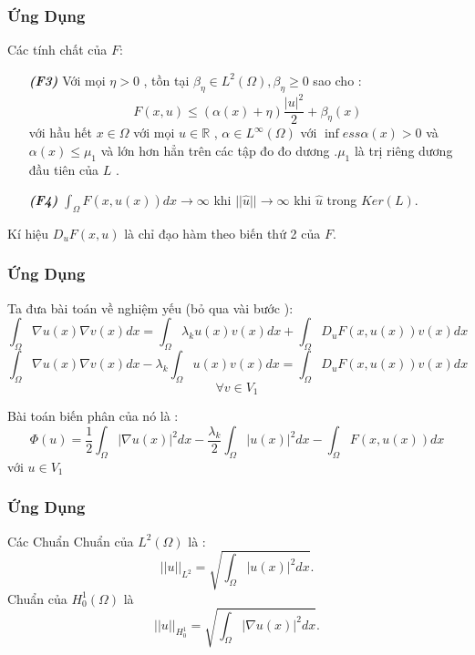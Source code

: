 \documentclass{beamer}
\begin{document}

\begin{frame}
\frametitle{Ứng Dụng}
\begin{block}{Các tính chất của $F$:}
\begin{itemize}
\item[\textbf{\textit{(F3)}}]  Với mọi $\eta  >0$ , tồn tại $\beta_{\eta}\in L^2(\Omega),\beta_{\eta}\geq 0$ sao cho : $$F(x,u)\leq (\alpha(x)+\eta)\frac{|u|^2}{2}+\beta_{\eta}(x)$$
với hầu hết $x\in \Omega$ với mọi $u\in \mathbb{R}$ , $\alpha \in L^{\infty}(\Omega)$ với $\inf ess \alpha(x)>0$ và $\alpha(x)\leq \mu_1$ và lớn hơn hẳn trên các tập đo đo dương .$\mu_1$ là trị riêng dương đầu tiên của $L$ .
\item[\textbf{\textit{(F4)}}] $\int_{\Omega}F(x,\widehat{u}(x))dx \rightarrow \infty$ khi $||\widehat{u}||\rightarrow \infty$ khi $\widehat{u}$ trong $Ker(L)$.
\end{itemize}
\end{block}
Kí hiệu $D_uF(x,u)$ là chỉ đạo hàm theo biến thứ 2 của $F$.\\
\end{frame}

\begin{frame}
\frametitle{Ứng Dụng}
\begin{block}{Ta đưa bài toán về nghiệm yếu (bỏ qua vài bước ):}
$$\int _{\Omega}\nabla u(x)\nabla v(x)dx=\int _{\Omega}\lambda_k u(x)v(x)dx+\int _{\Omega}D_uF(x,u(x))v(x)dx$$
$$\int _{\Omega}\nabla u(x)\nabla v(x)dx-\lambda_k\int _{\Omega} u(x)v(x)dx=\int _{\Omega}D_uF(x,u(x))v(x)dx$$
$$\forall v\in V_1$$
\end{block}
\begin{block}{Bài toán biến phân của nó là : }
$$\Phi(u)=\frac{1}{2}\int_{\Omega}|\nabla u(x)|^2dx-\frac{\lambda_k}{2}\int _{\Omega} |u(x)|^2dx-\int_{\Omega}F(x,u(x))dx$$
với $u\in V_1$\\
\end{block}
\end{frame}

\begin{frame}
\frametitle{Ứng Dụng}
\begin{block}{Các Chuẩn}
Chuẩn của $L^2(\Omega)$ là : $$||u||_{L^2}=\sqrt{\int_{\Omega}| u(x)|^2dx}.$$
Chuẩn của $H^1_0(\Omega)$ là $$||u||_{H^1_0}=\sqrt{\int_{\Omega}|\nabla u(x)|^2dx}.$$
\end{block}
\end{frame}
\end{document}
